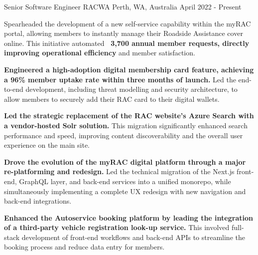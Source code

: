 

\begin{cventries}

  \cventry
    {Senior Software Engineer} %
    {RACWA} %
    {Perth, WA, Australia} %
    {April 2022 - Present} %
    {
      \begin{cvitems} %
        \item {Spearheaded the development of a new self-service capability within the myRAC portal, allowing members to instantly manage their Roadside Assistance cover online. This initiative automated \textbf{~3,700 annual member requests, directly improving operational efficiency} and member satisfaction.}
        \item {\textbf{Engineered a high-adoption digital membership card feature, achieving a 96\% member uptake rate within three months of launch.} Led the end-to-end development, including threat modelling and security architecture, to allow members to securely add their RAC card to their digital wallets.}
        \item {\textbf{Led the strategic replacement of the RAC website's Azure Search with a vendor-hosted Solr solution.} This migration significantly enhanced search performance and speed, improving content discoverability and the overall user experience on the main site.}
        \item {\textbf{Drove the evolution of the myRAC digital platform through a major re-platforming and redesign.} Led the technical migration of the Next.js front-end, GraphQL layer, and back-end services into a unified monorepo, while simultaneously implementing a complete UX redesign with new navigation and back-end integrations.}
        \item {\textbf{Enhanced the Autoservice booking platform by leading the integration of a third-party vehicle registration look-up service.} This involved full-stack development of front-end workflows and back-end APIs to streamline the booking process and reduce data entry for members.}
      \end{cvitems}
}
\end{cventries}
